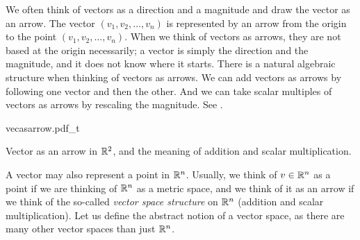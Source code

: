 We often think of vectors as a direction and a magnitude and draw the
vector as an arrow.  The vector $(v_1,v_2,\ldots,v_n)$ is represented
by an arrow from the origin to the point $(v_1,v_2,\ldots,v_n)$.
When we think of vectors as arrows, they are
not based at the origin necessarily; a vector is simply the direction and
the magnitude, and it does not know where it starts.
There is a natural algebraic structure when thinking of vectors as arrows.
We can add vectors as arrows by following one vector and then the other.
And we can take scalar multiples of vectors as arrows by rescaling
the magnitude.  See .
\begin{myfigureht}
{vecasarrow.pdf_t}
\caption{Vector as an arrow in ${\mathbb{R}}^2$, and the meaning of addition and
scalar multiplication.\label{fig:vecasarrow}}
\end{myfigureht}

A vector may also represent a point in ${\mathbb{R}}^n$.
Usually, we think of $v \in {\mathbb{R}}^n$
as a point if we are thinking of ${\mathbb{R}}^n$ as a metric space, and we think of
it as an arrow if we think of the so-called \emph{vector space structure} on
${\mathbb{R}}^n$ (addition and scalar multiplication).
Let us define the abstract notion of a vector space, as there
are many other vector spaces than just ${\mathbb{R}}^n$.

